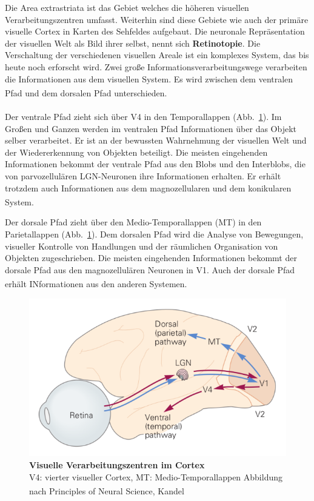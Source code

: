 \documentclass[12pt,a4paper,pdftex]{article}
\begin{document}
Die Area extrastriata ist das Gebiet welches die höheren visuellen Verarbeitungszentren umfasst. Weiterhin sind diese Gebiete wie auch der primäre visuelle Cortex in Karten des Sehfeldes aufgebaut. Die neuronale Repräsentation der visuellen Welt als Bild ihrer selbst, nennt sich \textbf{Retinotopie}.  Die Verschaltung der verschiedenen visuellen Areale ist ein komplexes System, das bis heute noch erforscht wird. Zwei große Informationsverarbeitungswege verarbeiten die Informationen aus dem visuellen System. Es wird zwischen dem ventralen Pfad und dem dorsalen Pfad unterschieden. \textsuperscript{\cite[25]{kandel2013principles}}
\\
\\ \noindent Der ventrale Pfad zieht sich über V4 in den Temporallappen (Abb.~\ref{fig:visual_pathway_cortex}). Im Großen und Ganzen werden im ventralen Pfad Informationen über das Objekt selber verarbeitet. Er ist an der bewussten Wahrnehmung der visuellen Welt und der Wiedererkennung von Objekten beteiligt. Die meisten eingehenden Informationen bekommt der ventrale Pfad aus den Blobs und den Interblobs, die von parvozellulären LGN-Neuronen ihre Informationen erhalten. Er erhält trotzdem auch Informationen aus dem magnozellularen und dem konikularen System. \textsuperscript{\cite[10]{neurowissenschaften_baer}}


Der dorsale Pfad zieht über den Medio-Temporallappen (MT) in den Parietallappen (Abb.~\ref{fig:visual_pathway_cortex}). Dem dorsalen Pfad wird die Analyse von Bewegungen, visueller Kontrolle von Handlungen  
und der räumlichen Organisation von Objekten zugeschrieben. Die meisten eingehenden Informationen bekommt der dorsale Pfad aus den magnozellulären Neuronen in V1. Auch der dorsale Pfad erhält INformationen aus den anderen Systemen. \textsuperscript{\cite[10]{neurowissenschaften_baer}}

\begin{figure}[H]
    \centering
    \includegraphics{pictures/visual/visual_Cortex.png}
    \caption[Visuelle Verarbeitungszentren im Cortex]{\textbf{Visuelle Verarbeitungszentren im Cortex}\\
    V4: vierter visueller Cortex, MT: Medio-Temporallappen
    Abbildung nach Principles of Neural Science, Kandel \textsuperscript{\cite[27]{kandel2013principles}}}
    \label{fig:visual_pathway_cortex}
\end{figure}
\end{document}
